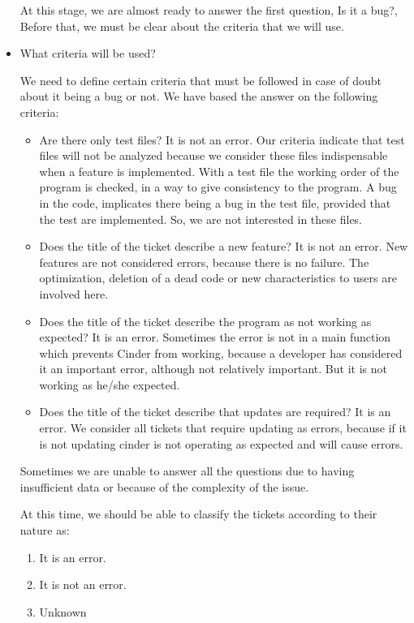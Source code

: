 \documentclass[a4paper]{article}
\begin{document}
\begin{itemize}
At this stage, we are almost ready to answer the first question, Is it a bug?, Before that, we must be clear about the criteria that we will use. 

\item What criteria will be used?

We need to define certain criteria that must be followed in case of doubt about it being a bug or not. We have based the answer on the following criteria:

\begin{itemize}
    \item Are there only test files?
    It is not an error. Our criteria indicate that test files will not be analyzed because we consider these files indispensable when a feature is implemented. With a test file the working order of the program is checked, in a way to give consistency to the program. A bug in the code, implicates there being a bug in the test file, provided that the test are implemented. So, we are not interested in these files.
    \item Does the title of  the ticket describe a new feature?
It is not an error. New features are not considered errors, because there is no failure. The optimization, deletion of a dead code or new characteristics to users are involved here.
    \item Does the title of the ticket describe the program as not working as expected?
It is an error. Sometimes the error is not in a main function which prevents Cinder from working, because a developer has considered it  an important error, although not relatively important. But it is not working as he/she expected.
    \item Does the title of the ticket describe that updates are required?
It is an error.  We consider all tickets that require updating as errors, because if it is not updating  cinder is not operating as expected and will cause errors.
\end{itemize}

Sometimes we are unable to answer all the questions due to having insufficient data or because of the complexity of the issue.

At this time, we should be able to classify the tickets according to their nature as:
\begin{enumerate}
    \item It is an error.
    \item It is not an error.
    \item Unknown
\end{enumerate}


\end{itemize}
\end{document}
